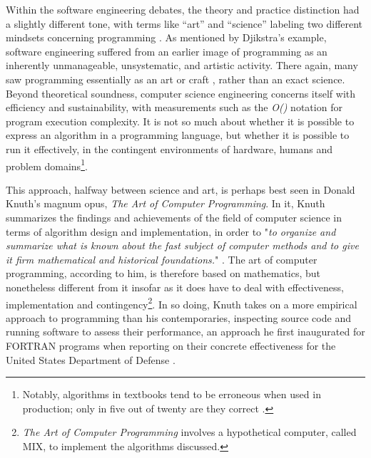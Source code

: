 Within the software engineering debates, the theory and practice distinction had a slightly different tone, with terms like “art” and “science” labeling two different mindsets concerning programming \citep{knuth_art_1997}. As mentioned by Djikstra's example, software engineering suffered from an earlier image of programming as an inherently unmanageable, unsystematic, and artistic activity. There again, many saw programming essentially as an art or craft \citep{tedre_development_2006}, rather than an exact science. Beyond theoretical soundness, computer science engineering concerns itself with efficiency and sustainability, with measurements such as the \emph{O()} notation for program execution complexity. It is not so much about whether it is possible to express an algorithm in a programming language, but whether it is possible to run it effectively, in the contingent environments of hardware, humans and problem domains\footnote{Notably, algorithms in textbooks tend to be erroneous when used in production; only in five out of twenty are they correct \citep{pattis_textbook_1988}.}.

This approach, halfway between science and art, is perhaps best seen in Donald Knuth's magnum opus, \emph{The Art of Computer Programming}. In it, Knuth summarizes the findings and achievements of the field of computer science in terms of algorithm design and implementation, in order to "\emph{to organize and summarize what is known about the fast subject of computer methods and to give it firm mathematical and historical foundations.}" \citep{knuth_art_1997}. The art of computer programming, according to him, is therefore based on mathematics, but nonetheless different from it insofar as it does have to deal with effectiveness, implementation and contingency\footnote{\emph{The Art of Computer Programming} involves a hypothetical computer, called MIX, to implement the algorithms discussed.}. In so doing, Knuth takes on a more empirical approach to programming than his contemporaries, inspecting source code and running software to assess their performance, an approach he first inaugurated for FORTRAN programs when reporting on their concrete effectiveness for the United States Department of Defense \citep{defensetechnicalinformationcenter_dtic_1970}.

